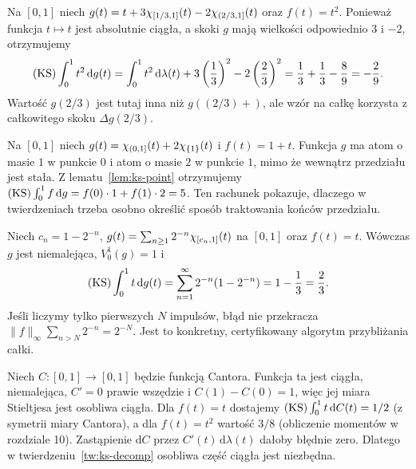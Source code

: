 \begin{przyklad}
Na $[0,1]$ niech $g(t)=t+3\chi_{[1/3,1]}(t)-2\chi_{(2/3,1]}(t)$ oraz $f(t)=t^2$. Ponieważ funkcja $t\mapsto t$ jest absolutnie ciągła, a skoki $g$ mają wielkości odpowiednio $3$ i $-2$, otrzymujemy
\[
 (\mathrm{KS})\int_0^1 t^2\,\mathrm dg(t)
 =\int_0^1 t^2\,\mathrm d\lambda(t)
 +3\left(\frac13\right)^2-2\left(\frac23\right)^2
 =\frac13+\frac13-\frac89=-\frac29.
\]
Wartość $g(2/3)$ jest tutaj inna niż $g((2/3)+)$, ale wzór na całkę korzysta z całkowitego skoku $\Delta g(2/3)$.
\end{przyklad}

\begin{przyklad}
Na $[0,1]$ niech $g(t)=\chi_{(0,1]}(t)+2\chi_{\{1\}}(t)$ i $f(t)=1+t$. Funkcja $g$ ma atom o masie $1$ w punkcie $0$ i atom o masie $2$ w punkcie $1$, mimo że wewnątrz przedziału jest stała. Z lematu~\ref{lem:ks-point} otrzymujemy
$(\mathrm{KS})\int_0^1 f\,\mathrm dg=f(0)\cdot1+f(1)\cdot2=5$.
Ten rachunek pokazuje, dlaczego w twierdzeniach trzeba osobno określić sposób traktowania końców przedziału.
\end{przyklad}

\begin{przyklad}
Niech $c_n=1-2^{-n}$, $g(t)=\sum_{n\ge1}2^{-n}\chi_{[c_n,1]}(t)$ na $[0,1]$ oraz $f(t)=t$. Wówczas $g$ jest niemalejąca, $V_0^1(g)=1$ i
\[
 (\mathrm{KS})\int_0^1 t\,\mathrm dg(t)
 =\sum_{n=1}^\infty2^{-n}(1-2^{-n})
 =1-\frac13=\frac23.
\]
Jeśli liczymy tylko pierwszych $N$ impulsów, błąd nie przekracza $\|f\|_\infty\sum_{n>N}2^{-n}=2^{-N}$. Jest to konkretny, certyfikowany algorytm przybliżania całki.
\end{przyklad}

\begin{przyklad}
Niech $C:[0,1]\to[0,1]$ będzie funkcją Cantora. Funkcja ta jest ciągła, niemalejąca, $C'=0$ prawie wszędzie i $C(1)-C(0)=1$, więc jej miara Stieltjesa jest osobliwa ciągła. Dla $f(t)=t$ dostajemy $(\mathrm{KS})\int_0^1 t\,\mathrm dC(t)=1/2$ (z symetrii miary Cantora), a dla $f(t)=t^2$ wartość $3/8$ (obliczenie momentów w rozdziale 10). Zastąpienie $\mathrm dC$ przez $C'(t)\,\mathrm d\lambda(t)$ dałoby błędnie zero. Dlatego w twierdzeniu~\ref{tw:ks-decomp} osobliwa część ciągła jest niezbędna.
\end{przyklad}

